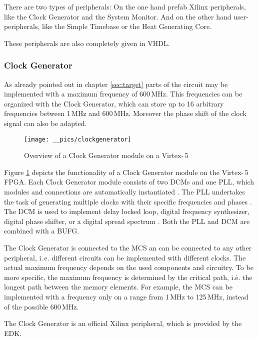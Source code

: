 There are two types of peripherals: On the one hand prefab Xilinx peripherals, like the Clock Generator and the System Monitor. And on the other hand user-\,peripherals, like the Simple Timebase or the Heat Generating Core.

These peripherals are also completely given in \ac{VHDL}.

\subsubsection{Clock Generator}

As already pointed out in chapter \ref{sec:target} parts of the circuit may be implemented with a maximum frequency of 600\,MHz. This frequencies can be organized with the Clock Generator, which can store up to 16 arbitrary frequencies between 1\,MHz and 600\,MHz. Moreover the phase shift of the clock signal can also be adapted.

\begin{figure}[h]
		\texttt{[image: \_\_pics/clockgenerator]}
		\caption{Overview of a Clock Generator module on a Virtex-\,5 \cite{Xilinx2010}}
		\label{pic:clockgen}	
	\end{figure}

Figure \ref{pic:clockgen} depicts the functionality of a Clock Generator module on the Virtex-\,5 \ac{FPGA}. Each Clock Generator module consists of two \acfp{DCM} and one \acf{PLL}, which modules and connections are automatically instantiated \cite{Xilinx2010}. The \ac{PLL} undertakes the task of generating multiple clocks with their specific frequencies and phases \cite{Xilinx2009}. The \ac{DCM} is used to implement delay locked loop, digital frequency synthesizer, digital phase shifter, or a digital spread spectrum \cite{Xilinx2009a}. Both the \ac{PLL} and \ac{DCM} are combined with a \ac{BUFG}.

The Clock Generator is connected to the \ac{MCS} an can be connected to any other peripheral, i.\,e. different circuits can be implemented with different clocks. The actual maximum frequency depends on the used components and circuitry. To be more specific, the maximum frequency is determined by the critical path, i.\.e. the longest path between the memory elements. For example, the \ac{MCS} can be implemented with a frequency only on a range from 1\,MHz to 125\,MHz, instead of the possible 600\,MHz.

The Clock Generator is an official Xilinx peripheral, which is provided by the \ac{EDK}.

